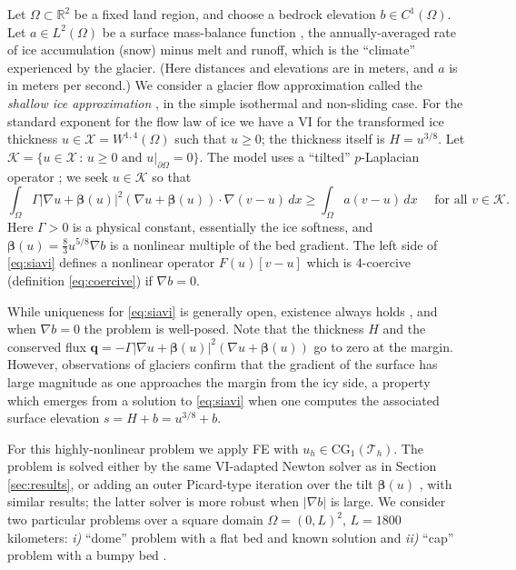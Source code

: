\documentclass[]{interact}
\theoremstyle{plain}%
\theoremstyle{definition}
\theoremstyle{remark}
\newcommand{\RR}{\mathbb{R}}
\newcommand{\grad}{\nabla}
\newcommand{\bq}{\mathbf{q}}
\newcommand{\cK}{\mathcal{K}}
\newcommand{\cT}{\mathcal{T}}
\newcommand{\cX}{\mathcal{X}}
\newcommand{\CG}{\text{CG}}
\begin{document}
Let $\Omega \subset \RR^2$ be a fixed land region, and choose a bedrock elevation $b \in C^1(\Omega)$.  Let $a \in L^2(\Omega)$ be a surface mass-balance function \cite{GreveBlatter2009}, the annually-averaged rate of ice accumulation (snow) minus melt and runoff, which is the ``climate'' experienced by the glacier.  (Here distances and elevations are in meters, and $a$ is in meters per second.)  We consider a glacier flow approximation called the \emph{shallow ice approximation} \cite{GreveBlatter2009}, in the simple isothermal and non-sliding case.   For the standard exponent for the flow law of ice \cite{GreveBlatter2009} we have a VI for the transformed ice thickness $u\in \cX = W^{1,4}(\Omega)$ such that $u\ge 0$; the thickness itself is $H=u^{3/8}$.  Let $\cK = \{u \in \cX\,:\,u\ge 0 \text{ and } u|_{\partial\Omega}=0\}$.  The model uses a ``tilted'' $p$-Laplacian operator \cite{JouvetBueler2012}; we seek $u\in\cK$ so that
\begin{equation}
\int_\Omega \Gamma |\grad u + \bm{\beta}(u)|^2 (\grad u + \bm{\beta}(u)) \cdot \grad (v-u) \,dx \ge \int_\Omega a (v-u)\,dx \quad \text{ for all } v \in \cK. \label{eq:siavi}
\end{equation}
Here $\Gamma>0$ is a physical constant, essentially the ice softness, and $\bm{\beta}(u)=\frac{8}{3} u^{5/8} \grad b$ is a nonlinear multiple of the bed gradient.  The left side of \eqref{eq:siavi} defines a nonlinear operator $F(u)[v-u]$ which is $4$-coercive (definition \eqref{eq:coercive}) if $\grad b=0$.

While uniqueness for \eqref{eq:siavi} is generally open, existence always holds \cite{JouvetBueler2012}, and when $\grad b=0$ the problem is well-posed.  Note that the thickness $H$ and the conserved flux $\bq = - \Gamma |\grad u + \bm{\beta}(u)|^2 (\grad u + \bm{\beta}(u))$ go to zero at the margin.  However, observations of glaciers confirm that the gradient of the surface has large magnitude as one approaches the margin from the icy side, a property which emerges from a solution to \eqref{eq:siavi} when one computes the associated surface elevation $s=H+b = u^{3/8} + b$.

For this highly-nonlinear problem we apply FE with $u_h\in\CG_1(\cT_h)$.  The problem is solved either by the same VI-adapted Newton solver as in Section \ref{sec:results}, or adding an outer Picard-type iteration over the tilt $\bm{\beta}(u)$ \cite{JouvetBueler2012}, with similar results; the latter solver is more robust when $|\grad b|$ is large.  We consider two particular problems over a square domain $\Omega=(0,L)^2$, $L=1800$ kilometers: \emph{i)} ``dome'' problem with a flat bed and known solution \cite{Bueler2016} and \emph{ii)} ``cap'' problem with a bumpy bed \cite[Example 8.4]{BuelerFarrell2024}.
\end{document}
